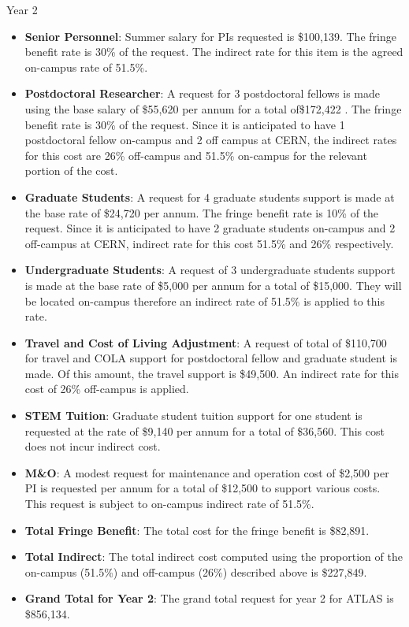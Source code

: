 \item{Year 2}
\begin{itemize}
\item{{\bf Senior Personnel}: Summer salary for PIs requested is \$100,139.   The fringe benefit rate is 30\% of the request.  The indirect rate for this item is the agreed on-campus rate of 51.5\%.}

\item {{\bf Postdoctoral Researcher}:  A request for 3 postdoctoral fellows is made using the base salary of \$55,620 per annum for a total of\$172,422 .  The fringe benefit rate is 30\% of the request.  Since it is anticipated to have 1 postdoctoral fellow on-campus and 2 off campus at CERN, the indirect rates for this cost are 26\% off-campus and 51.5\% on-campus for the relevant portion of the cost.} 

\item{{\bf Graduate Students}: A request for 4 graduate students support is made at the base rate of \$24,720 per annum.   The fringe benefit rate is 10\% of the request.  Since it is anticipated to have 2 graduate students on-campus and 2 off-campus at CERN, indirect rate for this cost 51.5\% and 26\% respectively.}

\item {{\bf Undergraduate Students}: A request of 3 undergraduate students support is made at the base rate of \$5,000 per annum for a total of \$15,000. They will be located on-campus therefore an indirect rate of 51.5\% is applied to this rate. }

\item{{\bf Travel and Cost of Living Adjustment}:  A request of total of \$110,700 for travel and COLA support for postdoctoral fellow and graduate student is made. Of this amount, the travel support is \$49,500.  An indirect rate for this cost of 26\% off-campus is applied. }

\item {{\bf STEM Tuition}: Graduate student tuition support for one student is requested at the rate of \$9,140 per annum for a total of \$36,560.  This cost does not incur indirect cost.}

\item {{\bf M\&O}: A modest request for maintenance and operation cost of \$2,500 per PI is requested per annum for a total of \$12,500 to support various costs. This request is subject to on-campus indirect rate of 51.5\%.}

\item {{\bf Total Fringe Benefit}: The total cost for the fringe benefit is \$82,891.}

\item {{\bf Total Indirect}: The total indirect cost computed using the proportion of the on-campus (51.5\%) and off-campus (26\%) described above is \$227,849.}

\item {{\bf Grand Total for Year 2}: The grand total request for year 2 for ATLAS is \$856,134.}

\end{itemize}

